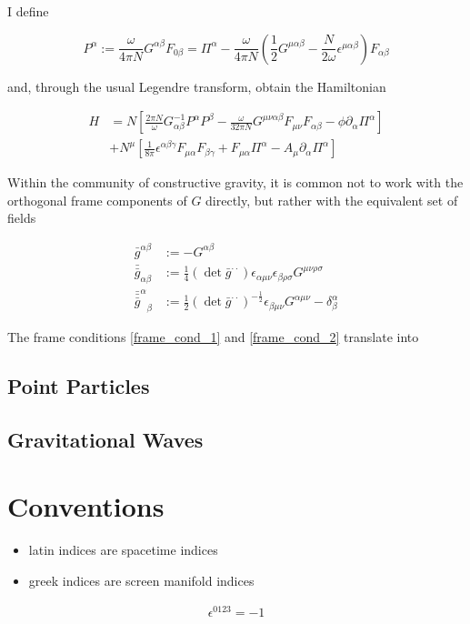 \documentclass[11pt]{article}
\begin{document}
I define 

\begin{equation}
	P^\alpha :=
	\frac{\omega}{4 \pi N} G^{\alpha \beta} F_{0 \beta}
	= \Pi^\alpha 
	- \frac{\omega}{4 \pi N} 
	\left( 
	\frac{1}{2} G^{\mu \alpha \beta} 
	- \frac{N}{2 \omega} \epsilon^{\mu \alpha \beta}
	\right)
	F_{\alpha \beta}
\end{equation}

and, through the usual Legendre transform, obtain the Hamiltonian 

\begin{equation}
	\begin{split}
		H &= N
		\left[
		\frac{2 \pi N}{\omega} G^{-1}_{\alpha \beta} P^\alpha P^\beta
		- \frac{\omega}{32 \pi N} G^{\mu \nu \alpha \beta} F_{\mu \nu} F_{\alpha \beta}
		- \phi \partial_\alpha \Pi^\alpha
		\right]\\
		&+ N^\mu
		\left[
		\frac{1}{8 \pi} \epsilon^{\alpha \beta \gamma} F_{\mu \alpha} F_{\beta \gamma} 
		+ F_{\mu \alpha} \Pi^{\alpha} - A_\mu \partial_\alpha \Pi^\alpha
		\right]
	\end{split}
\end{equation}

Within the community of constructive gravity, it is common not to work with the orthogonal frame components of $G$ directly, but rather with the equivalent set of fields

\begin{align}
	\bar{g}^{\alpha \beta} 
	&:= - G^{\alpha \beta}\\
	\bar{\bar{g}}_{\alpha \beta}
	&:= \frac{1}{4}\left( \det{\bar{g}^{\cdot \cdot}} \right)
	\epsilon_{\alpha \mu \nu} \epsilon_{\beta \rho \sigma}
	G^{\mu \nu \rho \sigma}\\
	{\bar{\bar{\bar{g}}}^\alpha}_\beta
	&:= \frac{1}{2}\left( \det{\bar{g}^{\cdot \cdot}} \right)^{-\frac{1}{2}}
	\epsilon_{\beta \mu \nu} G^{\alpha \mu \nu}
	 - \delta^\alpha_\beta
\end{align}

The frame conditions \ref{frame_cond_1} and \ref{frame_cond_2} translate into

\subsection{Point Particles}

\subsection{Gravitational Waves}

\section{Conventions}

\begin{itemize}
	\item latin indices are spacetime indices
	\item greek indices are screen manifold indices
\end{itemize}

\begin{align} \label{conv_eps}
	\epsilon^{0 1 2 3} =  - 1
\end{align}
\end{document}
